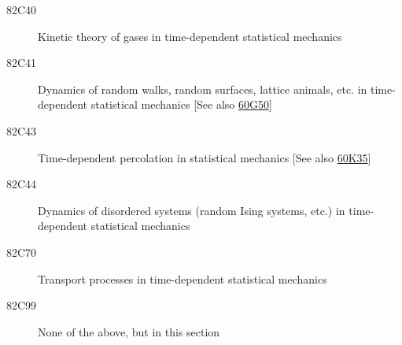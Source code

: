 \begin{description}
\item [82C40]\label{82C40} Kinetic theory of gases in time-dependent statistical mechanics
\item [82C41]\label{82C41} Dynamics of random walks, random surfaces, lattice animals, etc. in time-dependent statistical mechanics [See also \hyperref[60G50]{60G50}]
\item [82C43]\label{82C43} Time-dependent percolation in statistical mechanics [See also \hyperref[60K35]{60K35}]
\item [82C44]\label{82C44} Dynamics of disordered systems (random Ising systems, etc.) in time-dependent statistical mechanics
\item [82C70]\label{82C70} Transport processes in time-dependent statistical mechanics
\item [82C99]\label{82C99} None of the above, but in this section
\end{description}

